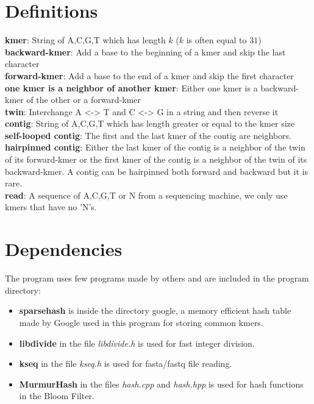 \documentclass[a4paper]{report}
\renewcommand{\b}[1]{\textbf{#1}}  %
\begin{document}
\chapter{Definitions}
\b{kmer}\cite{wiki:kmer}: String of A,C,G,T which has length $k$ ($k$ is often equal to $31$) \\[2pt]
\b{backward-kmer}: Add a base to the beginning of a kmer and skip the last character\\[2pt]
\b{forward-kmer}: Add a base to the end of a kmer and skip the first character\\[2pt]
\b{one kmer is a neighbor of another kmer}: Either one kmer is a backward-kmer of the other or a forward-kmer\\[2pt]
\b{twin}: Interchange A <-> T and C <-> G in a string and then reverse it \\[2pt]
\b{contig}: String of A,C,G,T which has length greater or equal to the kmer size\\[2pt]
\b{self-looped contig}: The first and the last kmer of the contig are neighbors.\\[2pt]
\b{hairpinned contig}: Either the last kmer of the contig is a neighbor of the twin of its forward-kmer or
the first kmer of the contig is a neighbor of the twin of its backward-kmer.
A contig can be hairpinned both forward and backward but it is rare.\\[2pt]
\b{read}: A sequence of A,C,G,T or N from a sequencing machine\cite{wiki:dnaseq}, we only use kmers that
have no 'N's.
\\[8pt]

\chapter{Dependencies}
The program uses few programs made by others and are included in the program directory:

\begin{itemize}
\item \b{sparsehash}\cite{sparsehash} is inside the directory google, a memory efficient hash table made by Google
    used in this program for storing common kmers.
\item \b{libdivide}\cite{libdivide} in the file \emph{libdivide.h} is used for fast integer division.
\item \b{kseq}\cite{kseq} in the file \emph{kseq.h} is used for fasta/fastq file reading.
\item \b{MurmurHash}\cite{smhasher} in the files \emph{hash.cpp} and \emph{hash.hpp} is used for hash functions in the Bloom Filter.
\end{itemize}
\end{document}
